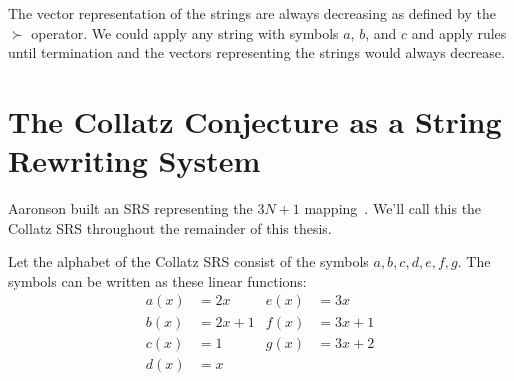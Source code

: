 \par
The vector representation of the strings are always decreasing as defined by the $\succ$ operator. We could apply any string with symbols $a$, $b$, and $c$ and apply rules until termination and the vectors representing the strings would always decrease.
\section{The Collatz Conjecture as a String Rewriting System} \label{subsec:CollatzSRS}
Aaronson built an SRS representing the $3N+1$ mapping~\cite{HeuleAaronson}. We'll call this the Collatz SRS throughout the remainder of this thesis. \par
Let the alphabet of the Collatz SRS consist of the symbols $a, b, c, d, e, f, g$. The symbols can be written as these linear functions:
\begin{align*}
  a(x) &= 2x & e(x) &= 3x \\
  b(x) &= 2x+1 & f(x) &= 3x+1 \\
  c(x) &= 1 & g(x) &= 3x+2 \\
  d(x) &= x & & 
\end{align*}


